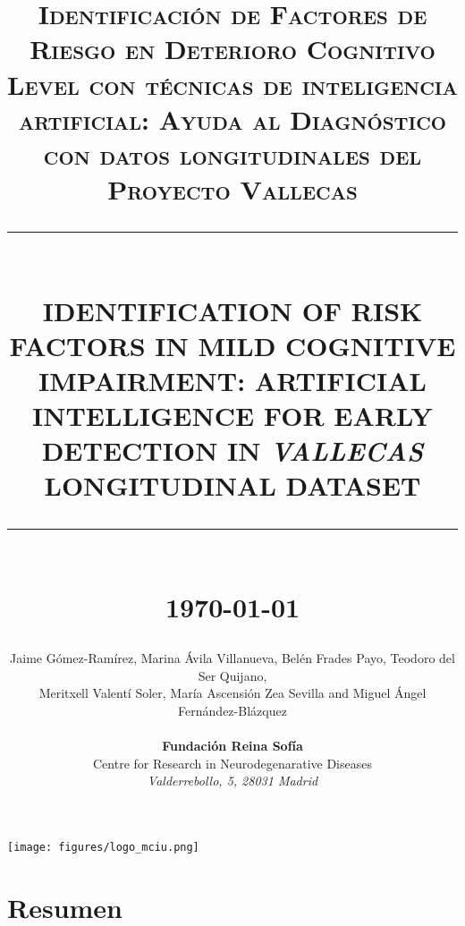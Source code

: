 \documentclass[11pt]{article}
\theoremstyle{definition}
\theoremstyle{remark}
\newcommand{\HRule}[1]{\rule{\linewidth}{#1}}
\begin{document}

\title{ \normalsize \textsc{Identificación de Factores de Riesgo en Deterioro Cognitivo Level con técnicas de inteligencia artificial: Ayuda al Diagnóstico con datos longitudinales del Proyecto Vallecas}
		\\ [2.0cm]
		\HRule{0.5pt} \\
		\LARGE \textbf{\uppercase{Identification of risk factors in Mild Cognitive Impairment: Artificial intelligence   for early detection in \emph{Vallecas} longitudinal dataset}}
		\HRule{2pt} \\ [0.5cm]
		\normalsize \today \vspace*{5\baselineskip}}

\date{ }
\author{
		Jaime G\'omez-Ram\'irez, Marina \'Avila Villanueva, Bel\'en Frades Payo, Teodoro del Ser Quijano,\\ Meritxell Valent\'i Soler, María Ascensi\'on Zea Sevilla and Miguel \'Angel Fern\'andez-Bl\'azquez   \\  \\
		\textbf{\large{Fundaci\'on Reina Sof\'ia}} \\
		Centre for Research in Neurodegenarative Diseases
		\\ \emph{Valderrebollo, 5, 28031 Madrid}
 }

\maketitle
\begin{center}
\texttt{[image: figures/logo\_mciu.png]}
\end{center}
\newpage
\tableofcontents
\newpage

\sectionfont{\scshape}



\section*{Resumen}
\end{document}
